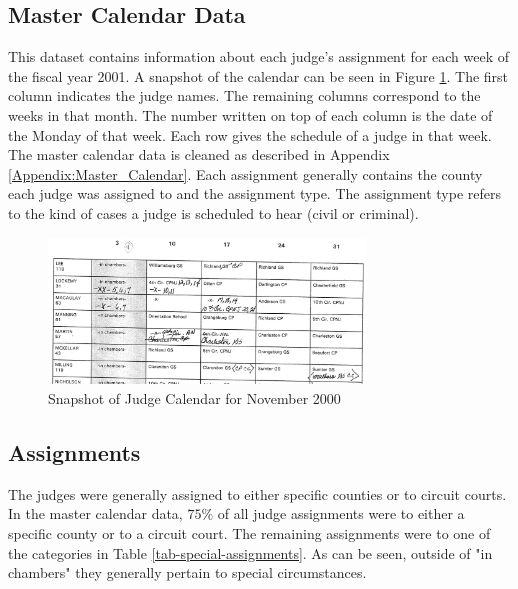 \documentclass[11pt, oneside]{article}   	%
\theoremstyle{ModifiedStyle}
\begin{document}
  \subsection{Master Calendar Data}
    This dataset contains information about each judge's assignment for each week of the fiscal year 2001. A snapshot of the calendar can be seen in Figure \ref{fig-calendar}. The first column indicates the judge names. The remaining columns correspond to the weeks in that month. The number written on top of each column is the date of the Monday of that week. Each row gives the schedule of a judge in that week. The master calendar data is cleaned as described in Appendix \ref{Appendix:Master_Calendar}. Each assignment generally contains the county each judge was assigned to and the assignment type. The assignment type refers to the kind of cases a judge is scheduled to hear (civil or criminal).

    \begin{figure}[h]
        \centering
        \caption{Snapshot of Judge Calendar for November 2000}
        \label{fig-calendar}
        \includegraphics[width=0.75\textwidth, keepaspectratio=true]{Figures/Fig4.png}
      \end{figure}

    \subsection{Assignments}
      The judges were generally assigned to either specific counties or to circuit courts. In the master calendar data, $75\%$ of all judge assignments were to either a specific county or to a circuit court. The remaining assignments were to one of the categories in Table \ref{tab-special-assignments}. As can be seen, outside of "in chambers" they generally pertain to special circumstances.
\end{document}
